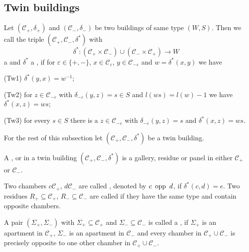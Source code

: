 \subsection{Twin buildings}

\begin{defi}
	Let $(\mathcal{C}_+, \delta_+)$ and $(\mathcal{C}_-, \delta_-)$ be two buildings of same type $(W,S)$. Then we call the triple $(\mathcal{C}_+,\mathcal{C}_-,\delta^*)$ with
	$$ \delta^* : (\mathcal{C}_+ \times \mathcal{C}_-) \cup (\mathcal{C}_- \times \mathcal{C}_+) \to W $$
	a  and $\delta^*$ a , if for $\varepsilon \in \{+,-\}$, $x \in \mathcal{C}_\varepsilon$, $y \in \mathcal{C}_{-\varepsilon}$ and $w = \delta^*(x,y)$ we have
	\begin{axioms}
		\item[(Tw1)] $\delta^*(y,x) = w^{-1}$;
		\item[(Tw2)] for $z \in \mathcal{C}_{-\varepsilon}$ with $\delta_{-\varepsilon}(y,z) = s \in S$ and $l(ws) = l(w) - 1$ we have $\delta^*(x,z) = ws$;
		\item[(Tw3)] for every $s \in S$ there is a $z \in \mathcal{C}_{-\varepsilon}$ with $\delta_{-\varepsilon}(y,z) = s$ and $\delta^*(x,z) = ws$.
	\end{axioms}
\end{defi}

	For the rest of this subsection let $(\mathcal{C}_+,\mathcal{C}_-,\delta^*)$ be a twin building.

\begin{defi}
	A ,  or  in a twin building $(\mathcal{C}_+,\mathcal{C}_-,\delta^*)$ is a gallery, residue or panel in either $\mathcal{C}_+$ or $\mathcal{C}_-$.
\end{defi}

\begin{defi}
	Two chambers $c \mathcal{C}_+$, $d \mathcal{C}_-$ are called , denoted by $c \opp d$, if $\delta^*(c,d) = e$. Two residues $R_+ \subseteq \mathcal{C}_+$, $R_- \subseteq \mathcal{C}_-$ are called  if they have the same type and contain opposite chambers.
\end{defi}

\begin{defi}
	A pair $(\Sigma_+,\Sigma_-)$ with $\Sigma_+ \subseteq \mathcal{C}_+$ and $\Sigma_- \subseteq \mathcal{C}_-$ is called a , if $\Sigma_+$ is an apartment in $\mathcal{C}_+$, $\Sigma_-$ is an apartment in $\mathcal{C}_-$ and every chamber in $\mathcal C_+ \cup \mathcal C_-$ is precisely opposite to one other chamber in $\mathcal C_+ \cup \mathcal C_-$.
\end{defi}

